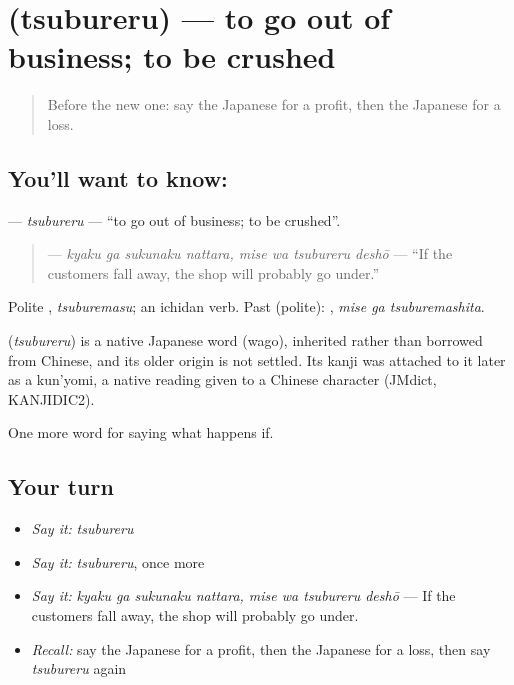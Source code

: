 \section[\texorpdfstring{\ja{つぶれる} (tsubureru)}{つぶれる (tsubureru)}]{ (tsubureru) — to go out of business; to be crushed}

\label{lesson:JA-C361-tsubureru}



\begin{quote}
Before the new one: say the Japanese for a profit, then the Japanese for a loss.
\end{quote}

\subsection*{You'll want to know: }
\textbf{} — \emph{tsubureru} — \textquotedblleft{}to go out of business; to be crushed\textquotedblright{}.

\begin{quote}
\textbf{   } — \emph{kyaku ga sukunaku nattara, mise wa tsubureru deshō} — \textquotedblleft{}If the customers fall away, the shop will probably go under.\textquotedblright{}
\end{quote}

Polite \textbf{}, \emph{tsuburemasu}; an ichidan verb. Past (polite): \textbf{ }, \emph{mise ga tsuburemashita}.

\begin{cousinweb}
\textbf{} (\emph{tsubureru}) is a native Japanese word (wago), inherited rather than borrowed from Chinese, and its older origin is not settled. Its kanji was attached to it later as a kun'yomi, a native reading given to a Chinese character (JMdict, KANJIDIC2).
\end{cousinweb}

\begin{grammarlens}[title={What you've built}]
One more word for saying what happens if.
\end{grammarlens}

\subsection*{Your turn}
\begin{itemize}
\raggedright
  \item \emph{Say it:} \emph{tsubureru}
  \item \emph{Say it:} \emph{tsubureru}, once more
  \item \emph{Say it:} \emph{kyaku ga sukunaku nattara, mise wa tsubureru deshō} — If the customers fall away, the shop will probably go under.
  \item \emph{Recall:} say the Japanese for a profit, then the Japanese for a loss, then say \emph{tsubureru} again
\end{itemize}

